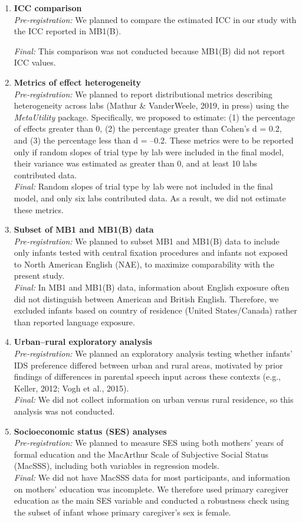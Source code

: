 \documentclass[
  ,man,floatsintext]{apa6}
\begin{document}
\begin{enumerate}
\def\labelenumi{\arabic{enumi}.}
\item
  \textbf{ICC comparison}\\
  \emph{Pre-registration:} We planned to compare the estimated ICC in our study with the ICC reported in MB1(B).

  \emph{Final:} This comparison was not conducted because MB1(B) did not report ICC values.
\item
  \textbf{Metrics of effect heterogeneity}\\
  \emph{Pre-registration:} We planned to report distributional metrics describing heterogeneity across labs (Mathur \& VanderWeele, 2019, in press) using the \emph{MetaUtility} package. Specifically, we proposed to estimate: (1) the percentage of effects greater than 0, (2) the percentage greater than Cohen's d = 0.2, and (3) the percentage less than d = --0.2. These metrics were to be reported only if random slopes of trial type by lab were included in the final model, their variance was estimated as greater than 0, and at least 10 labs contributed data.\\
  \emph{Final:} Random slopes of trial type by lab were not included in the final model, and only six labs contributed data. As a result, we did not estimate these metrics.
\item
  \textbf{Subset of MB1 and MB1(B) data}\\
  \emph{Pre-registration:} We planned to subset MB1 and MB1(B) data to include only infants tested with central fixation procedures and infants not exposed to North American English (NAE), to maximize comparability with the present study.\\
  \emph{Final:} In MB1 and MB1(B) data, information about English exposure often did not distinguish between American and British English. Therefore, we excluded infants based on country of residence (United States/Canada) rather than reported language exposure.
\item
  \textbf{Urban--rural exploratory analysis}\\
  \emph{Pre-registration:} We planned an exploratory analysis testing whether infants' IDS preference differed between urban and rural areas, motivated by prior findings of differences in parental speech input across these contexts (e.g., Keller, 2012; Vogh et al., 2015).\\
  \emph{Final:} We did not collect information on urban versus rural residence, so this analysis was not conducted.
\item
  \textbf{Socioeconomic status (SES) analyses}\\
  \emph{Pre-registration:} We planned to measure SES using both mothers' years of formal education and the MacArthur Scale of Subjective Social Status (MacSSS), including both variables in regression models.\\
  \emph{Final:} We did not have MacSSS data for most participants, and information on mothers' education was incomplete. We therefore used primary caregiver education as the main SES variable and conducted a robustness check using the subset of infant whose primary caregiver's sex is female.
\end{enumerate}
\end{document}
